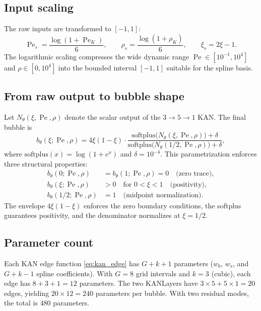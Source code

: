 \documentclass[11pt]{article}
\newcommand{\Pe}{\operatorname{Pe}}
\theoremstyle{remark}
\begin{document}
\subsection{Input scaling}

The raw inputs are transformed to $[-1,1]$:
\begin{equation}\label{eq:scaling}
\Pe_s = \frac{\log(1 + \Pe_K)}{6}, \qquad
\rho_s = \frac{\log(1 + \rho_K)}{6}, \qquad
\xi_s = 2\xi - 1.
\end{equation}
The logarithmic scaling compresses the wide dynamic range $\Pe \in [10^{-1}, 10^4]$ and $\rho \in [0, 10^4]$ into the bounded interval $[-1,1]$ suitable for the spline basis.

\subsection{From raw output to bubble shape}

Let $N_\theta(\xi, \Pe, \rho)$ denote the scalar output of the $3 \to 5 \to 1$ KAN. The final bubble is
\begin{equation}\label{eq:bubble_output}
b_\theta(\xi; \Pe, \rho) =
4\xi(1-\xi)
\cdot
\frac{\mathrm{softplus}\bigl(N_\theta(\xi, \Pe, \rho)\bigr) + \delta}
{\mathrm{softplus}\bigl(N_\theta(1/2, \Pe, \rho)\bigr) + \delta},
\end{equation}
where $\mathrm{softplus}(x) = \log(1 + e^x)$ and $\delta = 10^{-4}$. This parametrization enforces three structural properties:
\begin{align}
b_\theta(0; \Pe, \rho) &= b_\theta(1; \Pe, \rho) = 0 \quad \text{(zero trace)},\\
b_\theta(\xi; \Pe, \rho) &> 0 \quad \text{for } 0 < \xi < 1 \quad \text{(positivity)},\\
b_\theta(1/2; \Pe, \rho) &= 1 \quad \text{(midpoint normalization)}.
\end{align}
The envelope $4\xi(1-\xi)$ enforces the zero boundary conditions, the softplus guarantees positivity, and the denominator normalizes at $\xi = 1/2$.

\subsection{Parameter count}

Each KAN edge function \eqref{eq:kan_edge} has $G + k + 1$ parameters ($w_b$, $w_s$, and $G + k - 1$ spline coefficients). With $G = 8$ grid intervals and $k = 3$ (cubic), each edge has $8 + 3 + 1 = 12$ parameters. The two KANLayers have $3 \times 5 + 5 \times 1 = 20$ edges, yielding $20 \times 12 = 240$ parameters per bubble. With two residual modes, the total is $480$ parameters.
\end{document}
